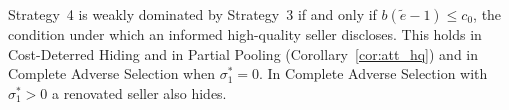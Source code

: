 \label{lem:renov_behaviour}
Strategy~4 is weakly dominated by Strategy~3 if and only if $b(\tilde e-1)\le c_0$, the condition under which an informed high-quality seller discloses. This holds in Cost-Deterred Hiding and in Partial Pooling (Corollary~\ref{cor:att_hq}) and in Complete Adverse Selection when $\sigma_1^*=0$. In Complete Adverse Selection with $\sigma_1^*>0$ a renovated seller also hides.
